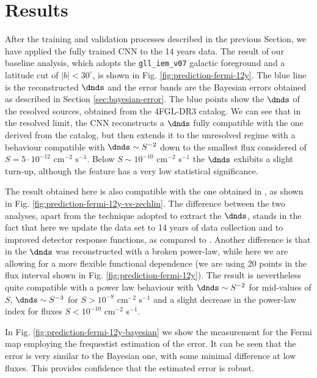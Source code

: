 \section{Results}
\label{sec:dnds:results}

After the training and validation processes described in the previous Section, we have applied the fully trained CNN to the 14 years \fermi data. The result of our baseline analysis, which adopts the \verb|gll_iem_v07| galactic foreground and a latitude cut of $|b|<30^\circ$, is shown in Fig. \ref{fig:prediction-fermi-12y}. The blue line is the reconstructed $\dnds$ and the error bands are the Bayesian errors obtained as described in Section \ref{sec:bayesian-error}. The blue points show the $\dnds$ of the resolved sources, obtained from the 4FGL-DR3 catalog. We can see that in the resolved limit, the CNN reconstructs a $\dnds$ fully compatible with the one derived from the catalog, but then extends it to the unresolved regime with a behaviour compatible with $\dnds \sim S^{-2}$ down to the smallest flux considered of $S = 5 \cdot 10^{-12}$ cm$^{-2}$ s$^{-1}$.
Below $S \sim  10^{-10}$ cm$^{-2}$ s$^{-1}$ the $\dnds$ exhibits a slight turn-up, although the feature has a very low statistical significance.

The result obtained here is also compatible with the one obtained in \cite{Cuoco-1pdf}, as shown in Fig. \ref{fig:prediction-fermi-12y-vs-zechlin}. The difference between the two analyses, apart from the technique adopted to extract the $\dnds$, stands in the fact that here we update the data set to 14 years of \fermi data collection and to improved detector response functions, as compared to \cite{Cuoco-1pdf}. Another difference is that in \cite{Cuoco-1pdf} the  $\dnds$ was reconstructed with a broken power-law, while here we are allowing for a more flexible functional dependence (we are using 20 points in the flux interval shown in Fig. \ref{fig:prediction-fermi-12y}). The result is nevertheless quite compatible with a power law behaviour with $\dnds \sim S^{-2}$ for mid-values of $S$, $\dnds \sim S^{-3}$ for $S > 10^{-8}$ cm$^{-2}$ s$^{-1}$ and a slight decrease in the power-law index for fluxes $S < 10^{-10}$ cm$^{-2}$ s$^{-1}$. 


In Fig. \ref{fig:prediction-fermi-12y-bayesian} we show the measurement for the Fermi map employing the frequestist estimation of the error. It can be seen that the error is very similar to the Bayesian one, with some minimal difference at low fluxes. This provides confidence that the estimated error is robust. 






